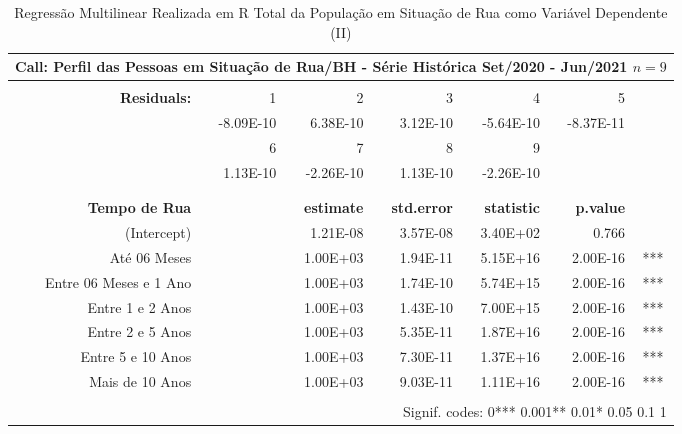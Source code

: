 \documentclass[12pt]{article}
\begin{document}
\begin{landscape}
\pagestyle{empty}
\begin{table}[htbp]
  \centering
  \caption{Regressão Multilinear Realizada em R Total da População em Situação de Rua como Variável Dependente (II)}
    \begin{tabular}{rrrrrrr}
    \hline
    \multicolumn{7}{c}{Call: Perfil das Pessoas em Situação de Rua/BH - Série Histórica Set/2020 - Jun/2021  $n = 9$} \\
    \midrule
         &      &      &      &      &      &  \\
    \textbf{Residuals:} & 1    & 2    & 3    & 4    & 5    &  \\
         & -8.09E-10 & 6.38E-10 & 3.12E-10 & -5.64E-10 & -8.37E-11 &  \\
         & 6    & 7    & 8    & 9    &      &  \\
         & 1.13E-10 & -2.26E-10 & 1.13E-10 & -2.26E-10 &      &  \\
         &      &      &      &      &      &  \\
         &      &      &      &      &      &  \\
    \textbf{Tempo de Rua} &      & \textbf{estimate} & \textbf{std.error} & \textbf{statistic} & \textbf{p.value} &  \\
    (Intercept) &      & 1.21E-08 & 3.57E-08 & 3.40E+02 & 0.766 &  \\
    Até 06 Meses &      & 1.00E+03 & 1.94E-11 & 5.15E+16 & 2.00E-16 & \multicolumn{1}{c}{***} \\
    Entre 06 Meses e 1 Ano &      & 1.00E+03 & 1.74E-10 & 5.74E+15 & 2.00E-16 & \multicolumn{1}{c}{***} \\
    Entre 1 e 2 Anos &      & 1.00E+03 & 1.43E-10 & 7.00E+15 & 2.00E-16 & \multicolumn{1}{c}{***} \\
    Entre 2 e 5 Anos &      & 1.00E+03 & 5.35E-11 & 1.87E+16 & 2.00E-16 & \multicolumn{1}{c}{***} \\
    Entre 5 e 10 Anos &      & 1.00E+03 & 7.30E-11 & 1.37E+16 & 2.00E-16 & \multicolumn{1}{c}{***} \\
    Mais de 10 Anos &      & 1.00E+03 & 9.03E-11 & 1.11E+16 & 2.00E-16 & \multicolumn{1}{c}{***} \\
         &      &      &      &      &      &  \\
    \midrule
    \multicolumn{7}{r}{Signif. codes:  0***  0.001**  0.01*  0.05  0.1  1} \\
    \midrule

\end{tabular}
\end{table}
\end{landscape}
\end{document}
